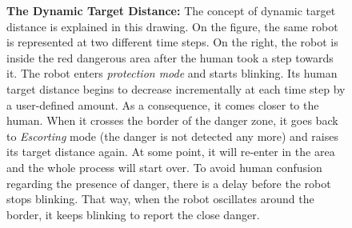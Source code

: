 \documentclass[oneside, a4paper, 12pt]{memoir}
\newcommand{\epuckblue}[3][0] %
{
	\draw [very thick, fill=RoyalBlue] (#2,#3) circle [radius=0.5];
	\draw [very thick, rotate around={#1:(#2,#3)}] (#2-0.25,#3-0.433) -- (#2,#3+0.45) -- (#2+0.25,#3-0.433);
}
\newcommand{\human}[3][0] %
{
	\draw [very thick, fill=white, rotate around={#1:(#2,#3)}] (#2-1,#3+0.5) ellipse (0.25cm and 0.5cm);
	\draw [very thick, fill=white, rotate around={#1:(#2,#3)}] (#2+1,#3+0.5) ellipse (0.25cm and 0.5cm);
	\draw [very thick, fill=white, rotate around={#1:(#2,#3)}] (#2,#3) ellipse (1.5cm and 0.75cm);
	\draw [thick, fill=white, rotate around={#1:(#2,#3)}] (#2-0.05,#3+1) -- (#2,#3+1.1) -- (#2+0.05,#3+1);
	\draw [very thick, fill=white, rotate around={#1:(#2,#3)}] (#2,#3+0.5) circle [radius=0.5cm];
}
\let\oldCaption\caption
\renewcommand{\caption}[2]{
\oldCaption[#1]{{\small\sffamily\bfseries #1:} #2}
}
\begin{document}
			\begin{figure}\centering
				
				\caption{The Dynamic Target Distance}{The concept of dynamic target distance is explained in this drawing. On the figure, the same robot is represented at two different time steps. On the right, the robot is inside the red dangerous area after the human took a step towards it. The robot enters \emph{protection mode} and starts blinking. Its human target distance begins to decrease incrementally at each time step by a user-defined amount. As a consequence, it comes closer to the human. When it crosses the border of the danger zone, it goes back to \emph{Escorting} mode (the danger is not detected any more) and raises its target distance again. At some point, it will re-enter in the area and the whole process will start over. To avoid human confusion regarding the presence of danger, there is a delay before the robot stops blinking. That way, when the robot oscillates around the border, it keeps blinking to report the close danger.}
				\label{fig:dynamic_target_distance}
			\end{figure}
			
\end{document}
